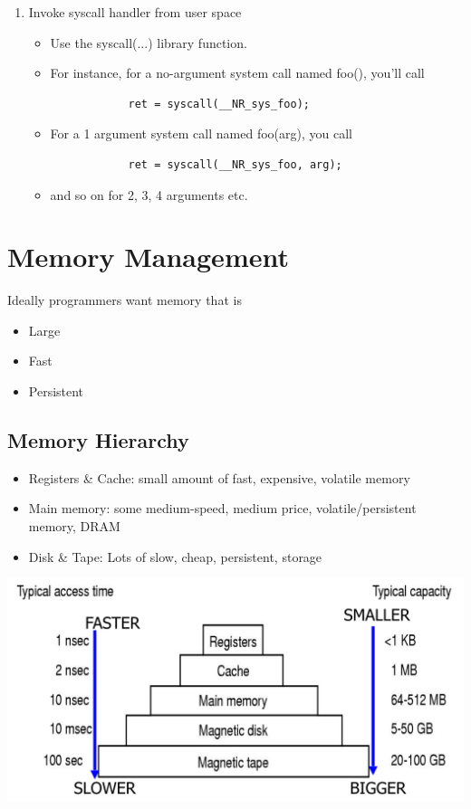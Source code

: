 \documentclass[12pt]{article}
\begin{document}
\begin{enumerate}
\begin{itemize}
    \end{itemize}
    \item Invoke syscall handler from user space \begin{itemize}
        \item Use the syscall(...) library function.
        \item For instance, for a no-argument system call named foo(), you'll call \begin{lstlisting}
            ret = syscall(__NR_sys_foo);
        \end{lstlisting}
        \item For a 1 argument system call named foo(arg), you call \begin{lstlisting}
            ret = syscall(__NR_sys_foo, arg);
        \end{lstlisting}
        \item and so on for 2, 3, 4 arguments etc.
    \end{itemize}
\end{enumerate}

\section{Memory Management}
Ideally programmers want memory that is
\begin{itemize}
    \item Large
    \item Fast
    \item Persistent
\end{itemize}

\subsection{Memory Hierarchy}
\begin{itemize}
    \item Registers \& Cache: small amount of fast, expensive, volatile memory
    \item Main memory: some medium-speed, medium price, volatile/persistent memory, DRAM
    \item Disk \& Tape: Lots of slow, cheap, persistent, storage
\end{itemize}
\includegraphics[width=\textwidth]{MemoryHierarchy.png}
\end{document}
